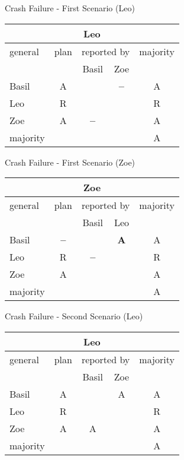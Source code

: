 \begin{wideslide}[bm=,toc=]{\large Crash Failure - First Scenario (Leo)}
\begin{center}
\begin{paenv}
\begin{tabular}{|l|c|c|c|c|}
\hline
\multicolumn{5}{|c|}{Leo}\\\hline
general & plan & \multicolumn{2}{|c|}{reported by} & majority \\\hline
 &  & Basil & Zoe & \\\hline
Basil & A && \textbf{--}  & A \\\hline
Leo & R & & & R\\\hline
Zoe & A & \textbf{--} && A\\\hline
majority &&&&A\\\hline
\end{tabular}
\end{paenv}
\end{center}
\end{wideslide}

\begin{wideslide}[bm=,toc=]{\large Crash Failure - First Scenario (Zoe)}
\begin{center}
\begin{paenv}
\begin{tabular}{|l|c|c|c|c|}
\hline
\multicolumn{5}{|c|}{Zoe}\\\hline
general & plan & \multicolumn{2}{|c|}{reported by} & majority \\\hline
 &  & Basil & Leo & \\\hline
Basil & \textbf{--} & & {\bfseries A} & A\\\hline
Leo & R & \textbf{--} & & R\\\hline
Zoe & A & & & A\\\hline
majority &&&&A\\\hline
\end{tabular}
\end{paenv}
\end{center}
\end{wideslide}

\begin{wideslide}[bm=,toc=]{\large Crash Failure - Second Scenario (Leo)}
\begin{center}
\begin{paenv}
\begin{tabular}{|l|c|c|c|c|}
\hline
\multicolumn{5}{|c|}{Leo}\\\hline
general & plan & \multicolumn{2}{|c|}{reported by} & majority \\\hline
 &  & Basil & Zoe & \\\hline
Basil & A &  &A & A \\\hline
Leo & R & & & R\\\hline
Zoe & A & A&  & A\\\hline
majority &&&&A\\\hline
\end{tabular}
\end{paenv}
\end{center}
\end{wideslide}

